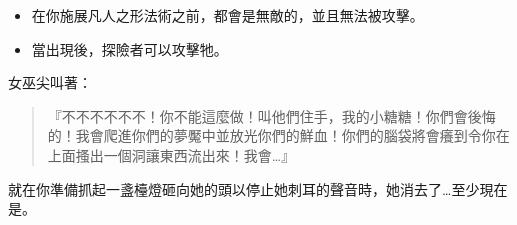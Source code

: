 \vspace*{-1em}
\begin{itemize}
	\item 在你施展凡人之形法術之前，都會是無敵的，並且無法被攻擊。
	\item 當出現後，探險者可以攻擊牠。
\end{itemize}

\begin{HauntStory}
	女巫尖叫著：
	\begin{quote}
		『不不不不不不！你不能這麼做！叫他們住手，我的小糖糖！你們會後悔的！我會爬進你們的夢魘中並放光你們的鮮血！你們的腦袋將會癢到令你在上面搔出一個洞讓東西流出來！我會…』
	\end{quote}
	就在你準備抓起一盞檯燈砸向她的頭以停止她刺耳的聲音時，她消去了…至少現在是。
\end{HauntStory}
